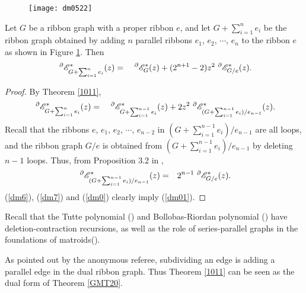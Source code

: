 \begin{figure}[h]
  \centering
  \texttt{[image: dm0522]}
   \caption{ }
 \label{dm0522}
\end{figure}
\begin{cor}\label{dmt}
Let $G$ be a ribbon graph with a  proper ribbon $e$, and let $G+\sum ^{n}_{i=1}e_{i}$ be the ribbon graph obtained by adding $n$ parallel ribbons $e_1$, $e_2$, $\cdots$,  $e_n$ to the ribbon $e$  as shown in Figure \ref{dm0522}.  Then
\begin{eqnarray}\label{dm01}
~^{\partial}{{\mathscr{E}}}^{*}_{G+ \sum ^{n}_{i=1}e_{i}}(z)&=&~^{\partial}{{\mathscr{E}}}^{*}_{G}(z)
+(2^{n+1}-2)z^{2}~^{\partial}{{\mathscr{E}}}^{*}_{G/ e}(z).
\end{eqnarray}
\end{cor}
\begin{proof}
By Theorem \ref{1011},
\begin{eqnarray}\label{dm6}
~^{\partial}{{\mathscr{E}}}^{*}_{G+ \sum ^{n}_{i=1}e_{i}}(z)&=&~^{\partial}{{\mathscr{E}}}^{*}_{G+ \sum ^{n-1}_{i=1}e_{i}}(z)
+2z^{2}~^{\partial}{{\mathscr{E}}}^{*}_{(G+ \sum ^{n-1}_{i=1}e_{i})/ e_{n-1}}(z).
\end{eqnarray}
 Recall that the ribbons $e$, $e_1$,  $e_2$, $\cdots$, $e_{n-2}$  in $(G+ \sum ^{n-1}_{i=1}e_{i})/ e_{n-1}$ are all loops, and the ribbon graph
$G/ e$ is obtained from $(G+ \sum ^{n-1}_{i=1}e_{i})/ e_{n-1}$ by deleting $n-1$ loops. Thus,
from Proposition 3.2 in  \cite{GMT20},
\begin{eqnarray}\label{dm7}
~^{\partial}{{\mathscr{E}}}^{*}_{(G+ \sum ^{n-1}_{i=1}e_{i})/ e_{n-1}}(z)&=&2^{n-1}~^{\partial}{{\mathscr{E}}}^{*}_{G/ e}(z).
\end{eqnarray}
(\ref{dm6}), (\ref{dm7}) and (\ref{dm0}) clearly imply (\ref{dm01}).

\end{proof}



Recall that the  Tutte polynomial (\cite{Tut54}) and Bollobas-Riordan polynomial (\cite{Bol02})  have  deletion-contraction  recursions, as well as the role of series-parallel graphs in the foundations of matroids(\cite{Bry71}).



\begin{rem}As pointed out by the anonymous referee, subdividing an edge is adding a parallel edge in the dual ribbon graph.
Thus Theorem \ref{1011} can be seen as the dual form of Theorem \ref{GMT20}.
\end{rem}




